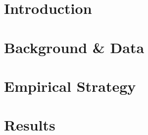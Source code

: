 \documentclass[12pt]{article}
\begin{document}
\begin{titlepage}
\begin{abstract}
\\
\vspace{0in}\\
\noindent\textbf{Keywords:} Road Maintenance, Local Taxation, Housing values, Artificial Intelligence \\
\vspace{0in}\\
\noindent\textbf{JEL Codes:} R42, H71, R10 \\

\bigskip
\end{abstract} 
\setcounter{page}{0}
\thispagestyle{empty}
\end{titlepage}
\pagebreak \newpage

\doublespacing

% 

\section{Introduction} \label{sec:introduction}



   


\section{Background \& Data} \label{sec:data}



\section{Empirical Strategy} \label{sec:empirical}



\section{Results} \label{sec:result}
\end{document}
